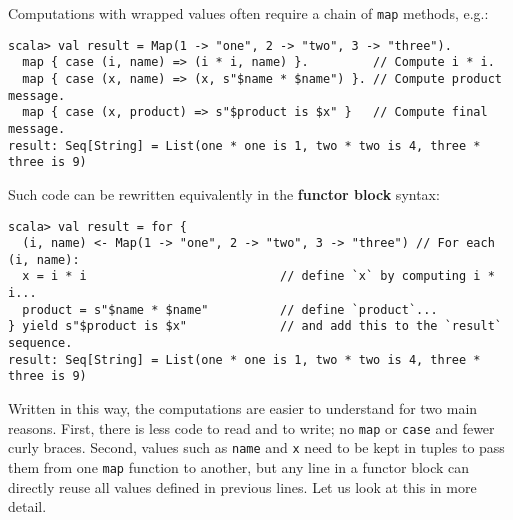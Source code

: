 Computations with wrapped values often require a chain of \lstinline!map!
methods, e.g.:
\begin{lstlisting}
scala> val result = Map(1 -> "one", 2 -> "two", 3 -> "three").
  map { case (i, name) => (i * i, name) }.         // Compute i * i.
  map { case (x, name) => (x, s"$name * $name") }. // Compute product message.
  map { case (x, product) => s"$product is $x" }   // Compute final message.
result: Seq[String] = List(one * one is 1, two * two is 4, three * three is 9)
\end{lstlisting}
Such code can be rewritten equivalently in the \textbf{functor
block} syntax:
\begin{lstlisting}
scala> val result = for {
  (i, name) <- Map(1 -> "one", 2 -> "two", 3 -> "three") // For each (i, name):
  x = i * i                           // define `x` by computing i * i...
  product = s"$name * $name"          // define `product`...
} yield s"$product is $x"             // and add this to the `result` sequence.
result: Seq[String] = List(one * one is 1, two * two is 4, three * three is 9) 
\end{lstlisting}
Written in this way, the computations are easier to understand for
two main reasons. First, there is less code to read and to write;
no \lstinline!map! or \lstinline!case! and fewer curly braces. Second,
values such as \lstinline!name! and \lstinline!x! need to be kept
in tuples to pass them from one \lstinline!map! function to another,
but any line in a functor block can directly reuse all values defined
in previous lines. Let us look at this in more detail.

